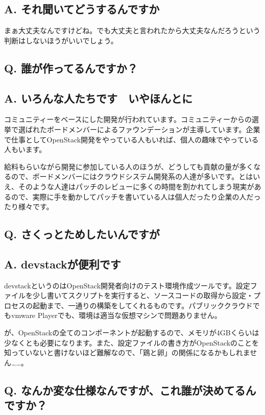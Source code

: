 \documentclass[9pt,b5paper,tombo,openany]{jsbook}
\begin{document}
\subsection*{{\LARGE\bfseries A.} それ聞いてどうするんですか}
まぁ大丈夫なんですけどね。でも大丈夫と言われたから大丈夫なんだろうという判断はしないほうがいいでしょう。

\subsection*{{\LARGE\bfseries Q.} 誰が作ってるんですか？}
\subsection*{{\LARGE\bfseries A.} いろんな人たちです　いやほんとに}
コミュニティーをベースにした開発が行われています。コミュニティーからの選挙で選ばれたボードメンバーによるファウンデーションが主導しています。企業で仕事としてOpenStack開発をやっている人もいれば、個人の趣味でやっている人もいます。

給料もらいながら開発に参加している人のほうが、どうしても貢献の量が多くなるので、ボードメンバーにはクラウドシステム開発系の人達が多いです。とはいえ、そのような人達はパッチのレビューに多くの時間を割かれてしまう現実があるので、実際に手を動かしてパッチを書いている人は個人だったり企業の人だったり様々です。

\subsection*{{\LARGE\bfseries Q.} さくっとためしたいんですが}
\subsection*{{\LARGE\bfseries A.} devstackが便利です}
devstackというのはOpenStack開発者向けのテスト環境作成ツールです。設定ファイルを少し書いてスクリプトを実行すると、ソースコードの取得から設定・プロセスの起動まで、一通りの構築をしてくれるものです。パブリッククラウドでもvmware Playerでも、環境は適当な仮想マシンで問題ありません。

が、OpenStackの全てのコンポーネントが起動するので、メモリが4GBくらいは少なくとも必要になります。また、設定ファイルの書き方がOpenStackのことを知っていないと書けないほど難解なので、「鶏と卵」の関係になるかもしれません……。

\subsection*{{\LARGE\bfseries Q.} なんか変な仕様なんですが、これ誰が決めてるんですか？}
\end{document}

